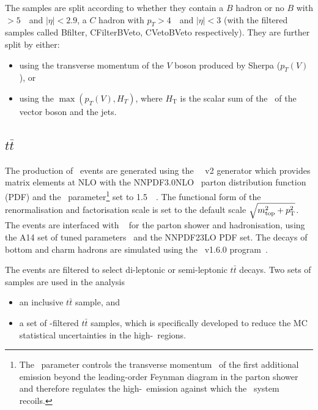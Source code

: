 \par The samples are split according to whether they contain a $B$ hadron or no $B$ with \pt$> 5$~\GeV~and $|\eta|<2.9$, 
a $C$ hadron with $p_T > 4$~\GeV~and $|\eta|<3$ (with the filtered samples called Bfilter, CFilterBVeto, CVetoBVeto respectively). 
They are further split by either:

\begin{itemize}
	\item using the transverse momentum of the $V$ boson produced by Sherpa ($p_T(V)$), or
	\item using the $\max(p_T(V), H_T)$, where $\ensuremath{H_{\mathrm{T}}}$ is the scalar sum of the \pt~of the vector boson and the jets.
\end{itemize}%

\subsection{$t\bar{t}$}

\par The production of \ttbar~events are generated using the \powhegbox~\cite{Frixione:2007nw,Nason:2004rx,Frixione:2007vw,Alioli:2010xd}~v2
generator which provides matrix elements at NLO with the NNPDF3.0NLO~\cite{Ball:2014uwa} parton distribution function (PDF) and the \hdamp\ parameter\footnote{The \hdamp\ parameter
controls the transverse momentum \pt\ of the first additional emission beyond the leading-order Feynman diagram
in the parton shower and therefore regulates the  high-\pt\ emission against which the \ttbar\ system recoils.} set to 1.5~\mtop~\cite{ATL-PHYS-PUB-2016-020}.
The functional form of the renormalisation and factorisation scale is set to the default scale $\sqrt{m_{\textrm{top}}^2 + p_{\textrm T}^2}$.
The events are interfaced with \pythia~\cite{Sjostrand:2014zea} for the parton shower and hadronisation,
using the A14 set of tuned parameters~\cite{ATL-PHYS-PUB-2014-021}  and the NNPDF23LO PDF set.
The decays of bottom and charm hadrons are simulated using the \evtgen\ v1.6.0 program~\cite{EvtGen}.

\par The events are filtered to select di-leptonic or semi-leptonic $t\bar{t}$ decays. Two sets of samples are used in the analysis

\begin{itemize}
	\item an inclusive $t\bar{t}$ sample, and
	\item a set of \met-filtered $t\bar{t}$ samples, which is specifically developed to reduce the MC statistical uncertainties in the high-\met~regions.
\end{itemize}

